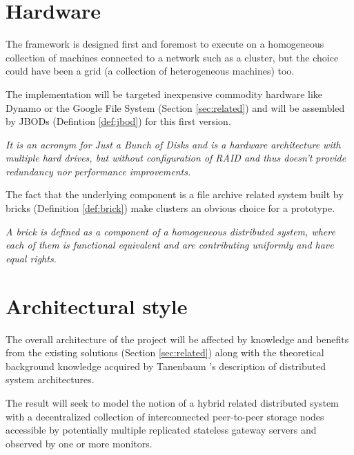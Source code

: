 \section{Hardware} \label{sec:hardware}
The framework is designed first and foremost to execute on a homogeneous collection of machines connected to a network such as a cluster, but the choice could have been a grid (a collection of heterogeneous machines) too. 
\newline

The implementation will be targeted inexpensive commodity hardware like Dynamo or the Google File System (Section \ref{sec:related}) and will be assembled by JBODs (Defintion \ref{def:jbod}) for this first version.

\vspace*{3mm}
\begin{definition}[JBOD] \label{def:jbod}
\textit{It is an acronym for Just a Bunch of Disks and is a hardware architecture with multiple hard drives, but without configuration of RAID and thus doesn't provide redundancy nor performance improvements.}
\end{definition}

The fact that the underlying component is a file archive related system built by bricks (Definition \ref{def:brick}) make clusters an obvious choice for a prototype.

\vspace*{3mm}
\begin{definition}[Brick] \label{def:brick}
\textit{A brick is defined as a component of a homogeneous distributed system, where each of them is functional equivalent and are contributing uniformly and have equal rights.}
\end{definition}
\vspace*{3mm}

\section{Architectural style} \label{sec:architectural-style}
The overall architecture of the project will be affected by knowledge and benefits from the existing solutions (Section \ref{sec:related}) along with the theoretical background knowledge acquired by Tanenbaum \etal's description of distributed system architectures\cite{Tanenbaum:2006:DSP:1202502}. 
\newline

The result will seek to model the notion of a hybrid related distributed system with a decentralized collection of interconnected peer-to-peer storage nodes accessible by potentially multiple replicated stateless gateway servers and observed by one or more monitors.

